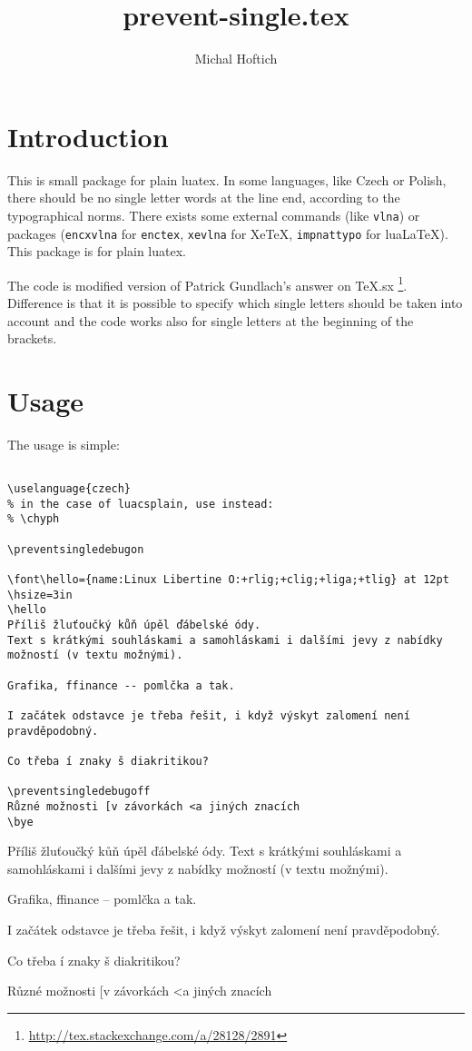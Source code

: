 \documentclass{ltxdoc}
\begin{document}
\title{prevent-single.tex}
\author{Michal Hoftich}
\maketitle
\section{Introduction}

This is small package for plain luatex. In some languages, like
Czech or Polish, there should be no single letter words at the line
end, according to the typographical norms. There exists some
external commands (like \verb!vlna!) or packages (\verb!encxvlna!
for \verb!enctex!, \verb!xevlna! for Xe\TeX,
\verb!impnattypo! for lua\LaTeX). This package is for plain
luatex.

The code is modified version of Patrick Gundlach's answer on
TeX.sx%
\footnote{\url{http://tex.stackexchange.com/a/28128/2891}}.
Difference is that it is possible to specify which single letters
should be taken into account and the code works also for single
letters at the beginning of the brackets.

\section{Usage}

The usage is simple:

\begin{verbatim}

\uselanguage{czech}
% in the case of luacsplain, use instead:
% \chyph

\preventsingledebugon

\font\hello={name:Linux Libertine O:+rlig;+clig;+liga;+tlig} at 12pt 
\hsize=3in
\hello
Příliš žluťoučký kůň úpěl ďábelské ódy. 
Text s krátkými souhláskami a samohláskami i dalšími jevy z nabídky možností (v textu možnými). 

Grafika, ffinance -- pomlčka a tak.

I začátek odstavce je třeba řešit, i když výskyt zalomení není pravděpodobný.

Co třeba í znaky š diakritikou?

\preventsingledebugoff
Různé možnosti [v závorkách <a jiných znacích
\bye
\end{verbatim}

\noindent\parbox{3in}{%
\preventsingledebugon

Příliš žluťoučký kůň úpěl ďábelské ódy. 
Text s krátkými souhláskami a samohláskami i dalšími jevy z nabídky možností (v textu možnými). 

Grafika, ffinance -- pomlčka a tak.

I začátek odstavce je třeba řešit, i když výskyt zalomení není pravděpodobný.

Co třeba í znaky š diakritikou?

\preventsingledebugoff
Různé možnosti [v závorkách <a jiných znacích

\preventsingledebugoff
}
\end{document}
